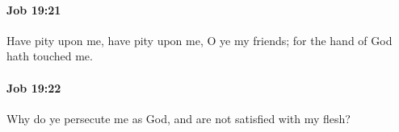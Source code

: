 		\paragraph{Job 19:21} %
			\label{JOB-19-21}

			Have pity upon me, have pity upon me, O ye my friends; for the hand of God hath touched me.


		\paragraph{Job 19:22} %
			\label{JOB-19-22}

			Why do ye persecute me as God, and are not satisfied with my flesh?


